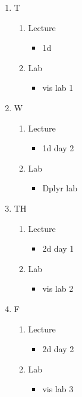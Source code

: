 \documentclass{article}
\begin{document}
\begin{enumerate}
\item T
\label{sec:orgd882df0}
\begin{enumerate}
\item Lecture
\label{sec:org17cee06}
\begin{itemize}
\item 1d
\end{itemize}
\item Lab
\label{sec:orgb213c1d}
\begin{itemize}
\item vis lab 1
\end{itemize}
\end{enumerate}
\item W
\label{sec:org2ae34f8}
\begin{enumerate}
\item Lecture
\label{sec:org8b3c814}
\begin{itemize}
\item 1d day 2
\end{itemize}
\item Lab
\label{sec:org0ba9b10}
\begin{itemize}
\item Dplyr lab
\end{itemize}
\end{enumerate}
\item TH
\label{sec:org178982a}
\begin{enumerate}
\item Lecture
\label{sec:org915de8c}
\begin{itemize}
\item 2d day 1
\end{itemize}
\item Lab
\label{sec:org354fecd}
\begin{itemize}
\item vis lab 2
\end{itemize}
\end{enumerate}
\item F
\label{sec:orgac14551}
\begin{enumerate}
\item Lecture
\label{sec:orgde7c899}
\begin{itemize}
\item 2d day 2
\end{itemize}
\item Lab
\label{sec:org33b0672}
\begin{itemize}
\item vis lab 3
\end{itemize}
\end{enumerate}
\end{enumerate}
\end{document}
